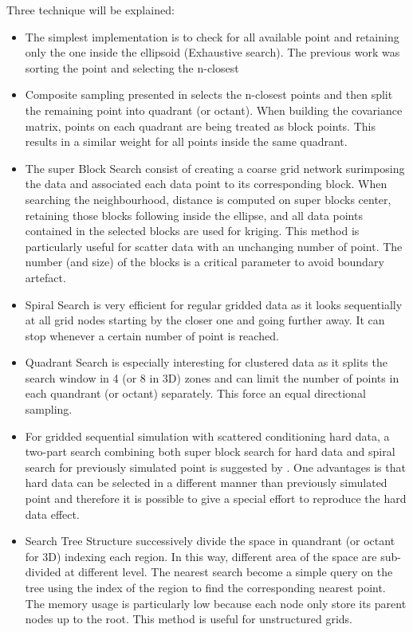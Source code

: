 \documentclass[twocolumn]{article}
\numberwithin{equation}{section}
\begin{document}
Three technique will be explained:
\begin{itemize}
\item The simplest implementation is to check for all available point and retaining only the one inside the ellipsoid (Exhaustive search).
The previous work was sorting the point and selecting the n-closest \citep{Ruggeri2013}
\item Composite sampling presented in \citep{isaaks1989introduction} selects the n-closest points and then split the remaining point into quadrant (or octant). When building the covariance matrix, points on each quadrant are being treated as block points. This results in a similar weight for all points inside the same quadrant.
\item The super Block Search \citep{deutsch1998gslib,Lyster2008} consist of creating a coarse grid network surimposing the data and associated each data point to its corresponding block. When searching the neighbourhood, distance is computed on super blocks center, retaining those blocks following inside the ellipse, and all data points contained in the selected blocks are used for kriging. This method is particularly useful for scatter data with an unchanging number of point. The number (and size) of the blocks is a critical parameter to avoid boundary artefact.
\item Spiral Search \citep{deutsch1998gslib} is very efficient for regular gridded data as it looks sequentially at all grid nodes starting by the closer one and going further away. It can stop whenever a certain number of point is reached.
\item Quadrant Search is especially interesting for clustered data as it splits the search window in 4 (or 8 in 3D) zones and can limit the number of points in each quandrant (or octant) separately. This force an equal directional sampling.
\item For gridded sequential simulation with scattered conditioning hard data, a two-part search combining both super block search for hard data and spiral search for previously simulated point is suggested by \cite{deutsch1998gslib}. One advantages is that hard data can be selected in a different manner than previously simulated point and therefore it is possible to give a special effort to reproduce the hard data effect.
\item Search Tree Structure \citep{Manchuk2004} successively divide the space in quandrant (or octant for 3D) indexing each region. In this way, different area of the space are sub-divided at different level. The nearest search become a simple query on the tree using the index of the region to find the corresponding nearest point. The memory usage is particularly low because each node only store its parent nodes up to the root. This method is useful for unstructured grids.
\end{itemize}
\end{document}
